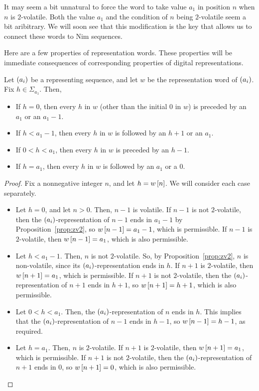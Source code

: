 \documentclass[english,12pt]{article}
\newcommand{\seq}{\p}
\begin{document}
It may seem a bit unnatural to force the word to take value $a_1$ in position $n$ when $n$ is $2$-volatile.  Both the value $a_1$ and the condition of $n$ being $2$-volatile seem a bit aribitrary.  We will soon see that this modification is the key that allows us to connect these words to Nim sequences.

Here are a few properties of representation words.  These properties will be immediate consequences of corresponding properties of digital representations.
\begin{prop}\label{prop:trivrep}
Let $\seq{a_i}$ be a representing sequence, and let $w$ be the representation word of $\seq{a_i}$.  Fix $h\in\Sigma_{a_1}$.  Then,
\begin{itemize}
\item If $h=0$, then every $h$ in $w$ (other than the initial $0$ in $w$) is preceded by an $a_1$ or an $a_1-1$.
\item If $h<a_1-1$, then every $h$ in $w$ is followed by an $h+1$ or an $a_1$.
\item If $0<h<a_1$, then every $h$ in $w$ is preceded by an $h-1$.
\item If $h=a_1$, then every $h$ in $w$ is followed by an $a_1$ or a $0$.
\end{itemize}
\end{prop}
\begin{proof}
Fix a nonnegative integer $n$, and let $h=w\left[n\right]$.  We will consider each case separately.
\begin{itemize}
\item Let $h=0$, and let $n>0$.  Then, $n-1$ is volatile.  If $n-1$ is not $2$-volatile, then the $\seq{a_i}$-representation of $n-1$ ends in $a_1-1$ by Proposition~\ref{prop:zv2}, so $w\left[n-1\right]=a_1-1$, which is permissible.  If $n-1$ is $2$-volatile, then $w\left[n-1\right]=a_1$, which is also permissible.
\item Let $h<a_1-1$.  Then, $n$ is not $2$-volatile.  So, by Proposition~\ref{prop:zv2}, $n$ is non-volatile, since its $\seq{a_i}$-representation ends in $h$.  If $n+1$ is $2$-volatile, then $w\left[n+1\right]=a_1$, which is permissible.  If $n+1$ is not $2$-volatile, then the $\seq{a_i}$-representation of $n+1$ ends in $h+1$, so $w\left[n+1\right]=h+1$, which is also permissible.
\item Let $0<h<a_1$.  Then, the $\seq{a_i}$-representation of $n$ ends in $h$.  This implies that the $\seq{a_i}$-representation of $n-1$ ends in $h-1$, so $w\left[n-1\right]=h-1$, as required.
\item Let $h=a_1$.  Then, $n$ is $2$-volatile.  If $n+1$ is $2$-volatile, then $w\left[n+1\right]=a_1$, which is permissible.  If $n+1$ is not $2$-volatile, then the $\seq{a_i}$-representation of $n+1$ ends in $0$, so $w\left[n+1\right]=0$, which is also permissible.
\end{itemize}
\end{proof}
\end{document}
